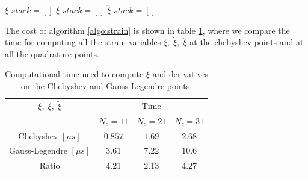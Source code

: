 \documentclass[12pt,a4paper]{article}
\begin{document}
\begin{algorithm}[ht]
\caption{The algorithm for computing the strains at every quadrature point}\label{algo:strain}


$\xi\_stack = []$\;
$\dot{\xi}\_stack = []$\;
$\ddot{\xi}\_stack = []$\;\;

\For{$i \in \left[0, N_c - 1 \right)$}{\;

	
	$\xi_1 = B\Phi\_stack[i]_{(x_1)} q + \bar{B} \xi_c$	\;
	$\xi_2 = B\Phi\_stack[i]_{(x_2)} q + \bar{B} \xi_c$	\;
	$\xi_3 = B\Phi\_stack[i]_{(x_3)} q + \bar{B} \xi_c$	\;
	$\xi\_stack[i] = \{\begin{matrix}\xi_1 & \xi_2 & \xi_3 \end{matrix} \}$\;\;
	
	
	$\dot{\xi} _1 = B\Phi\_stack[i]_{(x_1)} \dot{q} $	\;
	$\dot{\xi} _1 = B\Phi\_stack[i]_{(x_2)} \dot{q} $	\;
	$\dot{\xi} _1 = B\Phi\_stack[i]_{(x_3)} \dot{q} $	\;
	$\dot{\xi}\_stack[i] = \{\begin{matrix} \dot{\xi}_1 & \dot{\xi}_2 & \dot{\xi}_3 \end{matrix} \}$\;\;
	
	$\ddot{\xi} _1 = B\Phi\_stack[i]_{(x_1)} \ddot{q} $	\;
	$\ddot{\xi} _1 = B\Phi\_stack[i]_{(x_2)} \ddot{q} $	\;
	$\ddot{\xi} _1 = B\Phi\_stack[i]_{(x_3)} \ddot{q} $	\;
	$\ddot{\xi}\_stack[i] = \{\begin{matrix} \ddot{\xi}_1 & \ddot{\xi}_2 & \ddot{\xi}_3 \end{matrix} \}$\;\;
		
	
}\;

\end{algorithm}




The cost of algorithm \ref{algo:strain} is shown in table \ref{computational time strain}, where we compare the time for computing all the strain variables $\xi, \; \dot{\xi}, \; \ddot{\xi}$ at the chebyshev points and at all the quadrature points.


\begin{table}[ht]
	\begin{tabular}{c|c|c|c}
		$\xi, \; \dot{\xi}, \; \ddot{\xi}$ &	\multicolumn{3}{c}{Time} \\
		&	$N_c = 11$	&	$N_c = 21$	&	$N_c = 31 $	\\
		\hline
		Chebyshev $[\mu s]$&	 $0.857$	& $1.69$	&	$2.68$	\\
		Gauss-Legendre $[\mu s]$&	$3.61$	& $7.22$	&	$10.6$ \\
		\hline
		Ratio & $4.21$	&	$2.13$	&	$4.27$
	\end{tabular}
	\caption{Computational time need to compute $\xi$ and derivatives on the Chebyshev and Gauss-Legendre points.}\label{computational time strain}
\end{table}
	
\end{document}
